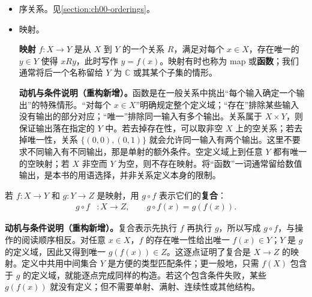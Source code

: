 \documentclass[../../main.tex]{subfiles}%
\begin{document}
\begin{itemize}
\item 序关系。见\cref{section:ch00-orderings}。
\item 映射。
\begin{definition}[映射]\label{definition:ch00-mappings-definition}
\textbf{映射} $f:X\to Y$ 是从 $X$ 到 $Y$ 的一个关系 $R$，满足对每个 $x\in X$，存在唯一的 $y\in Y$ 使得 $xRy$，此时写作 $y=f(x)$。映射有时也称为 map 或\textbf{函数}；我们通常将后一个名称留给 $Y$ 为 $\mathbb{C}$ 或其某个子集的情形。
\end{definition}
\begin{remark}
\textbf{动机与条件说明（重构新增）。}函数是在一般关系中挑出“每个输入确定一个输出”的特殊情形。“对每个 $x\in X$”明确规定整个定义域；“存在”排除某些输入没有输出的部分对应；“唯一”排除同一输入有多个输出。关系属于 $X\times Y$，则保证输出落在指定的 $Y$ 中。若去掉存在性，可以取非空 $X$ 上的空关系；若去掉唯一性，关系 $\{(0,0),(0,1)\}$ 就会允许同一输入有两个输出。这里不要求不同输入有不同输出，那是单射的额外条件。空定义域上到任意 $Y$ 都有唯一的空映射；若 $X$ 非空而 $Y$ 为空，则不存在映射。将“函数”一词通常留给数值输出，是本书的用语选择，并非关系定义本身的限制。
\end{remark}


\end{itemize}

\begin{definition}[映射的复合]\label{definition:ch00-composition}
若 $f:X\to Y$ 和 $g:Y\to Z$ 是映射，用 $g\circ f$ 表示它们的\textbf{复合}：
\begin{align*}
g\circ f&:X\to Z,\qquad g\circ f(x)=g(f(x)).
\end{align*}
\end{definition}
\begin{remark}
\textbf{动机与条件说明（重构新增）。}复合表示先执行 $f$ 再执行 $g$，所以写成 $g\circ f$，与操作的阅读顺序相反。对任意 $x\in X$，$f$ 的存在唯一性给出唯一 $f(x)\in Y$；$Y$ 是 $g$ 的定义域，因此又得到唯一 $g(f(x))\in Z$。这逐点证明了复合是 $X\to Z$ 的映射。定义中共用中间集合 $Y$ 是方便的类型匹配条件；更一般地，只需 $f(X)$ 包含于 $g$ 的定义域，就能逐点完成同样的构造。若这个包含条件失败，某些 $g(f(x))$ 就没有定义；但不需要单射、满射、连续性或其他结构。
\end{remark}
\end{document}
